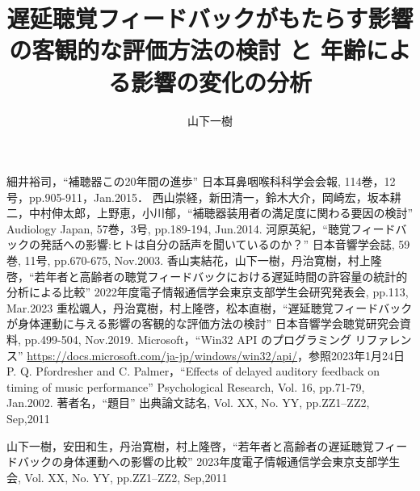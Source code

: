 \documentclass[a4paper,12pt]{jsreport}
\title{遅延聴覚フィードバックがもたらす影響の客観的な評価方法の検討
と
年齢による影響の変化の分析}
\author{山下\hspace{1zw}一樹}%
\begin{document}
\makecover%
\tableofcontents%










\begin{thebibliography}{99}
	細井裕司，``補聴器この20年間の進歩'' 日本耳鼻咽喉科科学会会報, 114巻，12号，pp.905-911，Jan.2015．
  西山崇経，新田清一，鈴木大介，岡崎宏，坂本耕二，中村伸太郎，上野恵，小川郁，``補聴器装用者の満足度に関わる要因の検討'' Audiology Japan, 57巻，3号, pp.189-194, Jun.2014.
  河原英紀，``聴覚フィードバックの発話への影響:ヒトは自分の話声を聞いているのか？'' 日本音響学会誌, 59巻, 11号, pp.670-675, Nov.2003.
  香山実結花，山下一樹，丹治寛樹，村上隆啓，``若年者と高齢者の聴覚フィードバックにおける遅延時間の許容量の統計的分析による比較'' 2022年度電子情報通信学会東京支部学生会研究発表会, pp.113, Mar.2023
  重松颯人，丹治寛樹，村上隆啓，松本直樹，``遅延聴覚フィードバックが身体運動に与える影響の客観的な評価方法の検討'' 日本音響学会聴覚研究会資料, pp.499-504, Nov.2019.
  Microsoft，``Win32 API のプログラミング リファレンス'' \url{https://docs.microsoft.com/ja-jp/windows/win32/api/}，参照2023年1月24日
  P. Q. Pfordresher and C. Palmer，``Effects of delayed auditory feedback on timing of music performance'' Psychological Research, Vol. 16, pp.71-79, Jan.2002.
  著者名，``題目'' 出典論文誌名, Vol. XX, No. YY, pp.ZZ1--ZZ2, Sep,2011

\end{thebibliography}
\begin{thepublished}{99}
	山下一樹，安田和生，丹治寛樹，村上隆啓，``若年者と高齢者の遅延聴覚フィードバックの身体運動への影響の比較'' 2023年度電子情報通信学会東京支部学生会, Vol. XX, No. YY, pp.ZZ1--ZZ2, Sep,2011
	
\end{thepublished}
\newpage



\appendix

\end{document}
